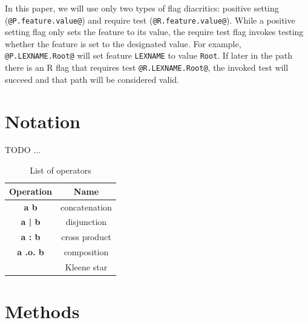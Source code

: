 \documentclass[11pt]{article}
\begin{document}
In this paper, we will use only two types of flag diacritics: positive
setting (\verb+@P.feature.value@+) and require test
(\verb+@R.feature.value@+). While a positive setting flag only sets the
feature to its value, the require test flag invokes testing whether the
feature is set to the designated value. For example,
\verb+@P.LEXNAME.Root@+ will set feature \texttt{LEXNAME} to value
\texttt{Root}. If later in the path there is an R flag that requires test
\verb+@R.LEXNAME.Root@+, the invoked test will succeed and that path
will be considered valid.


\section{Notation}
\label{sec:notation}
TODO ...


\begin{table}[h]
    \centering
    \begin{tabular}{|c|c|}
        \hline
        \bf Operation & \bf Name \\
        \hline\hline
        \bf a b & concatenation  \\
        \bf a | b & disjunction  \\
        \bf a : b & cross product  \\
        \bf a .o. b & composition  \\
        \bf * & Kleene star  \\
        

        \hline
    \end{tabular}
    \caption{List of operators
    \label{table:operators}}
\end{table}




\section{Methods}
\label{sec:methods}
\end{document}
